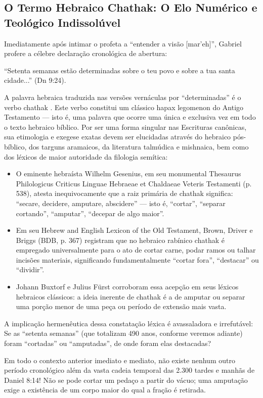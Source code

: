 \documentclass[11pt,a4paper,openany]{book}
\begin{document}
\subsection{O Termo Hebraico Chathak: O Elo Numérico e Teológico Indissolúvel}


Imediatamente após intimar o profeta a ``entender a visão [mar'eh]'', Gabriel profere a célebre declaração cronológica de abertura:

``Setenta semanas estão determinadas sobre o teu povo e sobre a tua santa cidade...'' (Dn 9:24).

A palavra hebraica traduzida nas versões vernáculas por ``determinadas'' é o verbo chathak . Este verbo constitui um clássico hapax legomenon do Antigo Testamento — isto é, uma palavra que ocorre uma única e exclusiva vez em todo o texto hebraico bíblico. Por ser uma forma singular nas Escrituras canônicas, sua etimologia e exegese exatas devem ser elucidadas através do hebraico pós-bíblico, dos targuns aramaicos, da literatura talmúdica e mishnaica, bem como dos léxicos de maior autoridade da filologia semítica:
\begin{itemize}
  \item O eminente hebraísta Wilhelm Gesenius, em seu monumental Thesaurus Philologicus Criticus Linguae Hebraeae et Chaldaeae Veteris Testamenti (p. 538), atesta inequivocamente que a raiz primária de chathak significa: ``secare, decidere, amputare, abscidere'' — isto é, ``cortar'', ``separar cortando'', ``amputar'', ``decepar de algo maior''.
  \item Em seu Hebrew and English Lexicon of the Old Testament, Brown, Driver e Briggs (BDB, p. 367) registram que no hebraico rabínico chathak é empregado universalmente para o ato de cortar carne, podar ramos ou talhar incisões materiais, significando fundamentalmente ``cortar fora'', ``destacar'' ou ``dividir''.
  \item Johann Buxtorf e Julius Fürst corroboram essa acepção em seus léxicos hebraicos clássicos: a ideia inerente de chathak é a de amputar ou separar uma porção menor de uma peça ou período de extensão mais vasta.
\end{itemize}


A implicação hermenêutica dessa constatação léxica é avassaladora e irrefutável: Se as ``setenta semanas'' (que totalizam 490 anos, conforme veremos adiante) foram ``cortadas'' ou ``amputadas'', de onde foram elas destacadas?

Em todo o contexto anterior imediato e mediato, não existe nenhum outro período cronológico além da vasta cadeia temporal das 2.300 tardes e manhãs de Daniel 8:14! Não se pode cortar um pedaço a partir do vácuo; uma amputação exige a existência de um corpo maior do qual a fração é retirada.
\end{document}
